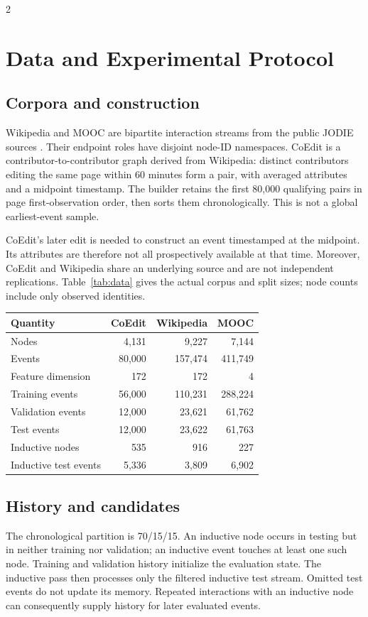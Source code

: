 \documentclass[a4paper,10pt,fleqn]{article}
\renewcommand{\small}{\fontsize{8}{12}\selectfont}
\begin{document}
\begin{multicols}{2}
\section{Data and Experimental Protocol}
\subsection{Corpora and construction}
Wikipedia and MOOC are bipartite interaction streams from the public JODIE sources \cite{jodie}. Their endpoint roles have disjoint node-ID namespaces. CoEdit is a contributor-to-contributor graph derived from Wikipedia: distinct contributors editing the same page within 60 minutes form a pair, with averaged attributes and a midpoint timestamp. The builder retains the first 80,000 qualifying pairs in page first-observation order, then sorts them chronologically. This is not a global earliest-event sample.

CoEdit's later edit is needed to construct an event timestamped at the midpoint. Its attributes are therefore not all prospectively available at that time. Moreover, CoEdit and Wikipedia share an underlying source and are not independent replications. Table~\ref{tab:data} gives the actual corpus and split sizes; node counts include only observed identities.

\begin{center}
\begin{minipage}{\linewidth}\centering
{}\label{tab:data}
\small
\begin{tabular}{@{}lrrr@{}}
\toprule
Quantity & CoEdit & Wikipedia & MOOC\\ \midrule
Nodes & 4,131 & 9,227 & 7,144\\
Events & 80,000 & 157,474 & 411,749\\
Feature dimension & 172 & 172 & 4\\
Training events & 56,000 & 110,231 & 288,224\\
Validation events & 12,000 & 23,621 & 61,762\\
Test events & 12,000 & 23,622 & 61,763\\
Inductive nodes & 535 & 916 & 227\\
Inductive test events & 5,336 & 3,809 & 6,902\\
\bottomrule
\end{tabular}
\end{minipage}
\end{center}

\subsection{History and candidates}
The chronological partition is 70/15/15. An inductive node occurs in testing but in neither training nor validation; an inductive event touches at least one such node. Training and validation history initialize the evaluation state. The inductive pass then processes only the filtered inductive test stream. Omitted test events do not update its memory. Repeated interactions with an inductive node can consequently supply history for later evaluated events.


\end{multicols}
\end{document}
